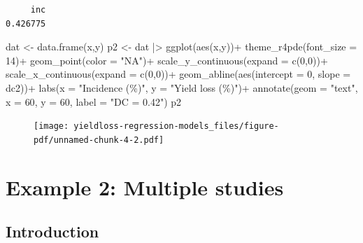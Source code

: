 \documentclass[
  letterpaper,
]{book}
\newenvironment{Shaded}{\begin{snugshade}}{\end{snugshade}}
\newcommand{\AttributeTok}[1]{\textcolor[rgb]{0.40,0.45,0.13}{#1}}
\newcommand{\DecValTok}[1]{\textcolor[rgb]{0.68,0.00,0.00}{#1}}
\newcommand{\FunctionTok}[1]{\textcolor[rgb]{0.28,0.35,0.67}{#1}}
\newcommand{\NormalTok}[1]{\textcolor[rgb]{0.00,0.23,0.31}{#1}}
\newcommand{\OtherTok}[1]{\textcolor[rgb]{0.00,0.23,0.31}{#1}}
\newcommand{\SpecialCharTok}[1]{\textcolor[rgb]{0.37,0.37,0.37}{#1}}
\newcommand{\StringTok}[1]{\textcolor[rgb]{0.13,0.47,0.30}{#1}}
\begin{document}
\begin{verbatim}
     inc 
0.426775 
\end{verbatim}

\begin{Shaded}
\begin{Highlighting}[]
\NormalTok{dat }\OtherTok{\textless{}{-}} \FunctionTok{data.frame}\NormalTok{(x,y)}
\NormalTok{p2 }\OtherTok{\textless{}{-}}\NormalTok{ dat }\SpecialCharTok{|\textgreater{}} 
  \FunctionTok{ggplot}\NormalTok{(}\FunctionTok{aes}\NormalTok{(x,y))}\SpecialCharTok{+}
  \FunctionTok{theme\_r4pde}\NormalTok{(}\AttributeTok{font\_size =} \DecValTok{14}\NormalTok{)}\SpecialCharTok{+}
  \FunctionTok{geom\_point}\NormalTok{(}\AttributeTok{color =} \StringTok{"NA"}\NormalTok{)}\SpecialCharTok{+}  
  \FunctionTok{scale\_y\_continuous}\NormalTok{(}\AttributeTok{expand =} \FunctionTok{c}\NormalTok{(}\DecValTok{0}\NormalTok{,}\DecValTok{0}\NormalTok{))}\SpecialCharTok{+}
  \FunctionTok{scale\_x\_continuous}\NormalTok{(}\AttributeTok{expand =} \FunctionTok{c}\NormalTok{(}\DecValTok{0}\NormalTok{,}\DecValTok{0}\NormalTok{))}\SpecialCharTok{+}
  \FunctionTok{geom\_abline}\NormalTok{(}\FunctionTok{aes}\NormalTok{(}\AttributeTok{intercept =} \DecValTok{0}\NormalTok{, }\AttributeTok{slope =}\NormalTok{ dc2))}\SpecialCharTok{+}
  \FunctionTok{labs}\NormalTok{(}\AttributeTok{x =} \StringTok{"Incidence (\%)"}\NormalTok{, }\AttributeTok{y =} \StringTok{"Yield loss (\%)"}\NormalTok{)}\SpecialCharTok{+}
  \FunctionTok{annotate}\NormalTok{(}\AttributeTok{geom =} \StringTok{"text"}\NormalTok{, }\AttributeTok{x =} \DecValTok{60}\NormalTok{, }\AttributeTok{y =} \DecValTok{60}\NormalTok{, }\AttributeTok{label =} \StringTok{"DC = 0.42"}\NormalTok{)}
\NormalTok{p2 }
\end{Highlighting}
\end{Shaded}

\begin{figure}[H]

{\centering \texttt{[image: yieldloss-regression-models\_files/figure-pdf/unnamed-chunk-4-2.pdf]}

}

\end{figure}

\hypertarget{example-2-multiple-studies}{%
\section{Example 2: Multiple studies}\label{example-2-multiple-studies}}

\hypertarget{introduction-5}{%
\subsection{Introduction}\label{introduction-5}}
\end{document}
